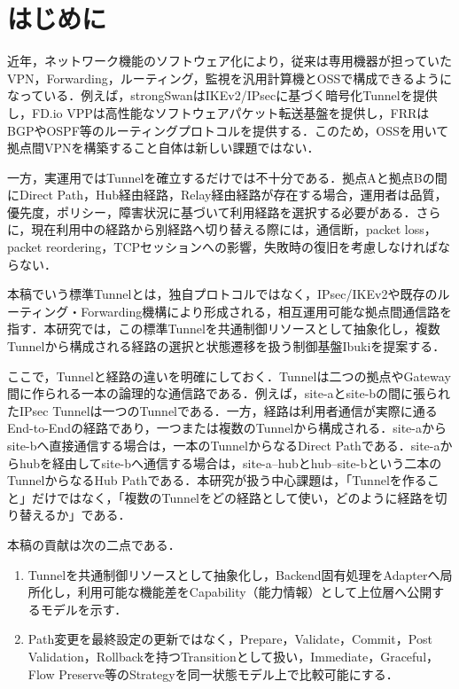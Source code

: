 \documentclass[11pt,a4paper,twoside]{ltjsarticle}
\begin{document}
\section{はじめに}
近年，ネットワーク機能のソフトウェア化により，従来は専用機器が担っていたVPN，Forwarding，ルーティング，監視を汎用計算機とOSSで構成できるようになっている．例えば，strongSwanはIKEv2/IPsecに基づく暗号化Tunnelを提供し，FD.io VPPは高性能なソフトウェアパケット転送基盤を提供し，FRRはBGPやOSPF等のルーティングプロトコルを提供する．このため，OSSを用いて拠点間VPNを構築すること自体は新しい課題ではない．

一方，実運用ではTunnelを確立するだけでは不十分である．拠点Aと拠点Bの間にDirect Path，Hub経由経路，Relay経由経路が存在する場合，運用者は品質，優先度，ポリシー，障害状況に基づいて利用経路を選択する必要がある．さらに，現在利用中の経路から別経路へ切り替える際には，通信断，packet loss，packet reordering，TCPセッションへの影響，失敗時の復旧を考慮しなければならない．

本稿でいう標準Tunnelとは，独自プロトコルではなく，IPsec/IKEv2や既存のルーティング・Forwarding機構により形成される，相互運用可能な拠点間通信路を指す．本研究では，この標準Tunnelを共通制御リソースとして抽象化し，複数Tunnelから構成される経路の選択と状態遷移を扱う制御基盤Ibukiを提案する．

ここで，Tunnelと経路の違いを明確にしておく．Tunnelは二つの拠点やGateway間に作られる一本の論理的な通信路である．例えば，site-aとsite-bの間に張られたIPsec Tunnelは一つのTunnelである．一方，経路は利用者通信が実際に通るEnd-to-Endの経路であり，一つまたは複数のTunnelから構成される．site-aからsite-bへ直接通信する場合は，一本のTunnelからなるDirect Pathである．site-aからhubを経由してsite-bへ通信する場合は，site-a--hubとhub--site-bという二本のTunnelからなるHub Pathである．本研究が扱う中心課題は，「Tunnelを作ること」だけではなく，「複数のTunnelをどの経路として使い，どのように経路を切り替えるか」である．

本稿の貢献は次の二点である．
\begin{enumerate}[leftmargin=*]
\item Tunnelを共通制御リソースとして抽象化し，Backend固有処理をAdapterへ局所化し，利用可能な機能差をCapability（能力情報）として上位層へ公開するモデルを示す．
\item Path変更を最終設定の更新ではなく，Prepare，Validate，Commit，Post Validation，Rollbackを持つTransitionとして扱い，Immediate，Graceful，Flow Preserve等のStrategyを同一状態モデル上で比較可能にする．
\end{enumerate}
\end{document}
